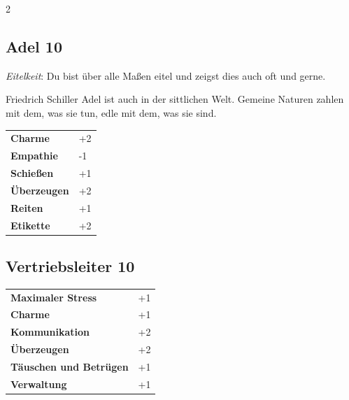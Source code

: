 \begin{multicols}{2}
\begin{tcolorbox}

\end{tcolorbox}

\begin{tcolorbox}
    \subsection*{Adel \hfill \small{10 }}
    \tcblower
\textit{Eitelkeit}: Du bist über alle Maßen eitel und zeigst dies auch oft und gerne.

\begin{pquote}{Friedrich Schiller}
Adel ist auch in der sittlichen Welt. Gemeine Naturen zahlen mit dem, was sie tun, edle mit dem, was sie sind.
\end{pquote}

\vspace{3mm}

\begin{tabular}{@{}ll@{}}
    \textbf{Charme} & +2\\
    \textbf{Empathie} & -1\\
    \textbf{Schießen} & +1\\
    \textbf{Überzeugen} & +2\\
    \textbf{Reiten} & +1\\
    \textbf{Etikette} & +2\\
\end{tabular}


\end{tcolorbox}

\begin{tcolorbox}
    \subsection*{Vertriebsleiter \hfill \small{10 }}
    \tcblower




\begin{tabular}{@{}ll@{}}
    \textbf{Maximaler Stress} & +1\\
    \textbf{Charme} & +1\\
    \textbf{Kommunikation} & +2\\
    \textbf{Überzeugen} & +2\\
    \textbf{Täuschen und Betrügen} & +1\\
    \textbf{Verwaltung} & +1\\
\end{tabular}


\end{tcolorbox}
\end{multicols}
